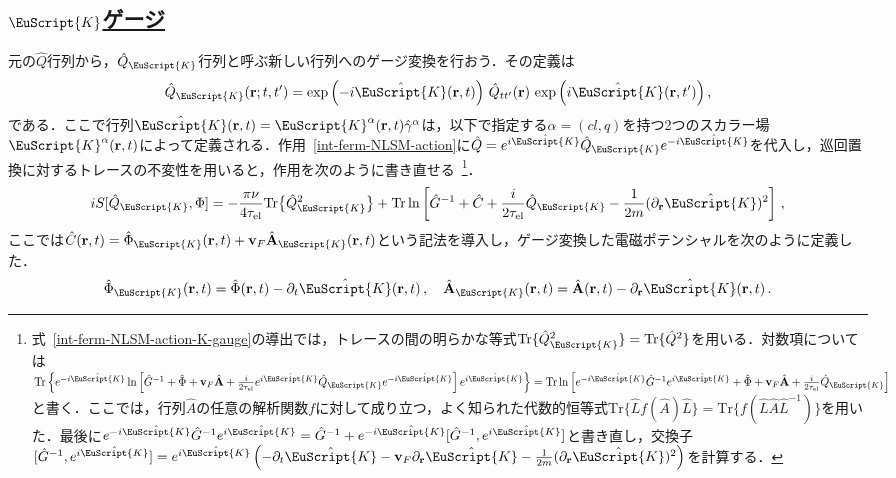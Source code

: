 \documentclass[a4paper,11pt]{ltjsarticle}
\newcommand{\subsectionlink}[1]{\subsection[#1]{\hyperlink{toc}{#1}}}
\def\Tr{\mathrm{Tr}}
\def\rt{(\mathbf{r},t)}
\def\rtp{(\mathbf{r},t')}
\def\Qk{\hat{Q}_{\EuScript{K}}}
\def\tauel{\tau_{\mathrm{el}}}
\begin{document}
\subsectionlink{$\EuScript{K}$ゲージ}\label{sec_int_ferm-2}

元の$\hat Q$行列から，$\Qk$行列と呼ぶ新しい行列へのゲージ変換を行おう．その定義は
\begin{equation}\label{int-ferm-NLSM-Q-K-gauge}
\hat{Q}_{\EuScript{K}}(\mathbf{r};t,t')=\exp\left(-i\hat{\EuScript{K}}\rt\right)
\,\hat{Q}_{tt'}(\mathbf{r})\,
\exp\left(i\hat{\EuScript{K}}\rtp\right),
\end{equation}
である．ここで行列$\hat{\EuScript{K}}\rt=\EuScript{K}^{\alpha}\rt\hat{\gamma}^{\alpha}$は，以下で指定する$\alpha=(cl,q)$を持つ2つのスカラー場$\EuScript{K}^{\alpha}\rt$によって定義される．作用~\eqref{int-ferm-NLSM-action}に$\hat
Q =e^{i \hat{\EuScript{K}}} \hat{Q}_{\EuScript{K}}
e^{-i\hat{\EuScript{K}}}$を代入し，巡回置換に対するトレースの不変性を用いると，作用を次のように書き直せる~\footnote{式~\eqref{int-ferm-NLSM-action-K-gauge}の導出では，トレースの間の明らかな等式$\Tr\{\Qk^{2}\}=\Tr\{\hat{Q}^{2}\}$を用いる．対数項については$\Tr\left\{e^{-i\hat{\EuScript{K}}}
\ln\left[\hat{G}^{-1}+\hat{\Phi}+\mathbf{v}_{F}\hat{\mathbf{A}}+\frac{i}{2\tauel}
e^{i\hat{\EuScript{K}}}\Qk
e^{-i\hat{\EuScript{K}}}\right]e^{i\hat{\EuScript{K}}}\right\}= \Tr
\ln\left[e^{-i\hat{\EuScript{K}}}\hat{G}^{-1}e^{i\hat{\EuScript{K}}}+
\hat{\Phi}+\mathbf{v}_{F}\hat{\mathbf{A}}+\frac{i}{2\tauel}
\Qk\right]$と書く．ここでは，行列$\hat{A}$の任意の解析関数$f$に対して成り立つ，よく知られた代数的恒等式$\Tr\{\hat{L}f(\hat{A})\hat{L}\}=\Tr\{
f(\hat{L}\hat{A}\hat{L}^{-1})\}$を用いた．最後に$e^{-i\hat{\EuScript{K}}}\hat{G}^{-1}e^{i\hat{\EuScript{K}}}=\hat{G}^{-1}+
e^{-i\hat{\EuScript{K}}}[\hat{G}^{-1},e^{i\hat{\EuScript{K}}}]$と書き直し，交換子$[\hat{G}^{-1},e^{i\hat{\EuScript{K}}}]=
e^{i\hat{\EuScript{K}}} \left(-\partial_{t}
\hat{\EuScript{K}}-\mathbf{v}_{F}\partial_{\mathbf{r}}\hat{\EuScript{K}}
-\frac{1}{2m}
(\partial_{\mathbf{r}}\hat{\EuScript{K}})^{2}\right)$を計算する．}．
\begin{equation}\label{int-ferm-NLSM-action-K-gauge}
iS[\hat
Q_{\EuScript{K}},\Phi]=-\frac{\pi\nu}{4\tauel}\Tr\big\{\Qk^{2}\big\}+
\Tr\ln\left[\hat{G}^{-1}+\hat{C}+\frac{i}{2\tauel}\Qk-\frac{1}{2m}(\partial_{\mathbf{r}}
\hat{\EuScript{K}})^{2}\right]\,,
\end{equation}
ここでは$\hat{C}\rt = \hat{\Phi}_{\EuScript{K}}\rt+
\mathbf{v}_{F}\hat{\mathbf{A}}_{\EuScript{K}}\rt $という記法を導入し，ゲージ変換した電磁ポテンシャルを次のように定義した．
\begin{equation}\label{int-ferm-NLSM-C}
\hat{\Phi}_{\EuScript{K}}\rt=\hat{\Phi}\rt-\partial_{t}\hat{\EuScript{K}}\rt\,,\quad
\hat{\mathbf{A}}_{\EuScript{K}}\rt=
\hat{\mathbf{A}}\rt-\partial_{\mathbf{r}}\hat{\EuScript{K}}\rt\,.
\end{equation}
\end{document}
